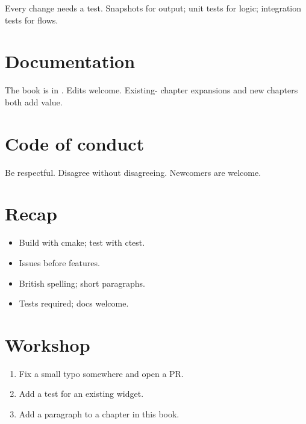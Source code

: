 Every change needs a test. Snapshots for output;
unit tests for logic; integration tests for flows.

\section{Documentation}

The book is in . Edits welcome. Existing-
chapter expansions and new chapters both add value.

\section{Code of conduct}

Be respectful. Disagree without disagreeing. Newcomers are
welcome.

\section{Recap}

\begin{recap}
\begin{itemize}[leftmargin=*]
  \item Build with cmake; test with ctest.
  \item Issues before features.
  \item British spelling; short paragraphs.
  \item Tests required; docs welcome.
\end{itemize}
\end{recap}

\section*{Workshop}

\begin{enumerate}[leftmargin=*]
  \item Fix a small typo somewhere and open a PR.
  \item Add a test for an existing widget.
  \item Add a paragraph to a chapter in this book.
\end{enumerate}
